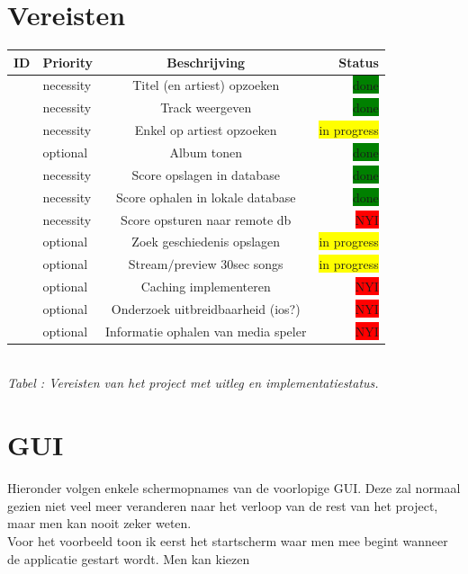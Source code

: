 \documentclass[11pt,a4paper]{article}
\newcommand{\boxgreen}{\colorbox{green}{\color{black}done}}
\newcommand{\boxyellow}{\colorbox{yellow}{\color{black}in progress}}
\newcommand{\boxred}{\colorbox{red}{\color{black}NYI}}
\newcounter{reqc}
\newcommand{\reqID} {%
   \stepcounter{reqc}%
   \thereqc}
\newcounter{tabc}
\newcommand{\tabID} {%
   \stepcounter{tabc}%
   \thetabc}
\begin{document}
\section{Vereisten}
	\begin{tabular}{| l | l | c | r |}
	\hline
	ID 		& 	Priority	&	Beschrijving						& Status \\ \hline \hline
	\reqID	&	necessity	&	Titel (en artiest) opzoeken			& \boxgreen \\ \hline
	\reqID 	& 	necessity	&	Track weergeven						& \boxgreen \\ \hline
	\reqID	& 	necessity	&	Enkel op artiest opzoeken 			& \boxyellow \\ \hline
	\reqID 	& 	optional	&	Album tonen 						& \boxgreen \\ \hline
	\reqID	& 	necessity	&	Score opslagen in database 			& \boxgreen  \\ \hline
	\reqID 	& 	necessity	&	Score ophalen in lokale database 	& \boxgreen \\ \hline
	\reqID	& 	necessity	&	Score opsturen naar remote db		& \boxred \\ \hline
	\reqID	& 	optional	&	Zoek geschiedenis opslagen			& \boxyellow \\ \hline
	\reqID	&	optional	&	Stream$/$preview 30sec songs		& \boxyellow \\ \hline
	\reqID	&	optional	&	Caching implementeren				& \boxred \\ \hline
	\reqID 	& 	optional	&	Onderzoek uitbreidbaarheid (ios?)	& \boxred \\ \hline
	\reqID 	&	optional	&	Informatie ophalen van media speler & \boxred \\ \hline
	
	\hline	
	\end{tabular} \\ \newline
	\small \textit{Tabel \tabID : Vereisten van het project met uitleg en implementatiestatus.} \normalsize
	
\section{GUI}
	Hieronder volgen enkele schermopnames van de voorlopige GUI. Deze zal normaal gezien niet veel meer veranderen naar het verloop van de rest van het project, maar men kan nooit zeker weten.\\
	Voor het voorbeeld toon ik eerst het startscherm waar men mee begint wanneer de applicatie gestart wordt. Men kan kiezen
	
\end{document}
